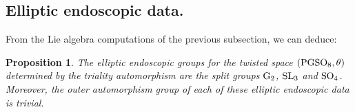 \documentclass[11pt]{amsart}
\theoremstyle{plain}
\newtheorem{prop}[equation]{Proposition}
\numberwithin{equation}{section}
\def\SL{{\rm SL}}
\def\PGSO{{\rm PGSO}}
\def\SO{{\rm SO}}
\begin{document}
 
 
   
 
 
 \vskip 5pt
 
 \subsection{\bf Elliptic endoscopic data.}
 From the Lie algebra computations of the previous subsection, we can deduce:
 \vskip 5pt
 
  
 \begin{prop}  \label{P:ell-endo-data}
 The elliptic endoscopic groups for the twisted space $(\PGSO_8, \theta)$ determined by the triality automorphism are the split groups ${\rm G}_2$, $\SL_3$ and $\SO_4$. 
 Moreover, the outer automorphism group of each of  these elliptic endoscopic data is trivial. 
 \end{prop}
 
\end{document}
